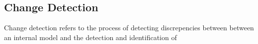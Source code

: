 \subsection{Change Detection}

Change detection refers to the process of detecting discrepencies between between an internal model and  the detection and identification of 